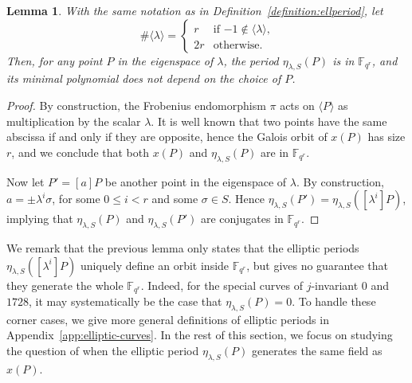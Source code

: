 \documentclass[12pt]{article}
\theoremstyle{plain}
\newtheorem{lemma}[theorem]{Lemma}
\theoremstyle{definition}
\def\F{\ensuremath{\mathbb{F}}}
\begin{document}
\begin{lemma}
  With the same notation as in Definition~\ref{definition:ellperiod},
  let
  \begin{equation*}
    \#\langle\lambda\rangle =
    \begin{cases}
      r & \text{if $-1\notin\langle\lambda\rangle$,}\\
      2r & \text{otherwise.}
    \end{cases}
  \end{equation*}
  Then, for any point $P$ in the eigenspace of $\lambda$, the period
  $\eta_{\lambda,S}(P)$ is in $\F_{q^r}$, and its minimal polynomial
  does not depend on the choice of $P$.
\end{lemma}
\begin{proof}
  By construction, the Frobenius endomorphism $\pi$ acts on
  $\langle P\rangle$ as multiplication by the scalar $\lambda$. It is
  well known that two points have the same abscissa if and only if
  they are opposite, hence the Galois orbit of $x(P)$ has size $r$,
  and we conclude that both $x(P)$ and $\eta_{\lambda,S}(P)$ are in
  $\F_{q^r}$.

  Now let $P'=[a]P$ be another point in the eigenspace of
  $\lambda$. By construction, $a=\pm \lambda^i\sigma$, for some
  $0\le i<r$ and some $\sigma\in S$. Hence
  $\eta_{\lambda,S}(P')=\eta_{\lambda,S}([\lambda^i]P)$, implying that
  $\eta_{\lambda,S}(P)$ and $\eta_{\lambda,S}(P')$ are conjugates in
  $\F_{q^r}$.
\end{proof}

We remark that the previous lemma only states that the elliptic
periods $\eta_{\lambda,S}([\lambda^i]P)$ uniquely define an orbit
inside $\F_{q^r}$, but gives no guarantee that they generate the whole
$\F_{q^r}$. Indeed, for the special curves of $j$-invariant $0$ and
$1728$, it may systematically be the case that
$\eta_{\lambda,S}(P)=0$.
To handle these corner cases, we give more general definitions of elliptic
periods in Appendix~\ref{app:elliptic-curves}.
In the rest of this section, we focus on studying the question of
when the elliptic period $\eta_{\lambda,S}(P)$ generates the same field
as $x(P)$.
\end{document}
